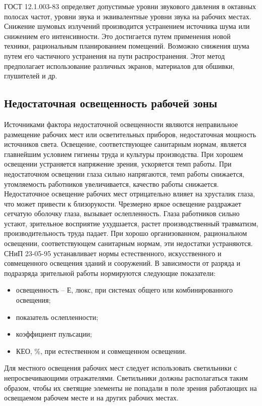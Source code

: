 ГОСТ 12.1.003-83 определяет допустимые уровни звукового давления в октавных полосах частот, уровни звука и эквивалентные уровни звука на рабочих местах. Снижение шумовых излучений производится устранением источника шума или снижением его интенсивности. Это достигается путем применения новой техники, рациональным планированием помещений. Возможно снижения шума путем его частичного устранения на пути распространения. Этот метод предполагает использование различных экранов, материалов для обшивки, глушителей и др.

\subsection{Недостаточная освещенность рабочей зоны}
Источниками фактора недостаточной освещенности являются неправильное размещение рабочих мест или осветительных приборов, недостаточная мощность источников света. Освещение, соответствующее санитарным нормам, является главнейшим условием гигиены труда и культуры производства. При хорошем освещении устраняется напряжение зрения, ускоряется темп работы. При недостаточном освещении глаза сильно напрягаются, темп работы снижается, утомляемость работников увеличивается, качество работы снижается. Недостаточное освещение рабочих мест отрицательно влияет на хрусталик глаза, что может привести к близорукости. Чрезмерно яркое освещение раздражает сетчатую оболочку глаза, вызывает ослепленность. Глаза работников сильно устают, зрительное восприятие ухудшается, растет производственный травматизм, производительность труда падает. При хорошо организованном, рациональном освещении, соответствующем санитарным нормам, эти недостатки устраняются.
СНиП 23-05-95 устанавливает нормы естественного, искусственного и совмещенного освещения зданий и сооружений. В зависимости от разряда и подразряда зрительной работы нормируются следующие показатели:
\begin{itemize}
	\item освещенность – Е, люкс, при системах общего или комбинированного освещения; 
	\item показатель ослепленности;
	\item коэффициент пульсации;
	\item КЕО, \%, при естественном и совмещенном освещении.
\end{itemize}
Для местного освещения рабочих мест следует использовать светильники с непросвечивающими отражателями. Светильники должны располагаться таким образом, чтобы их светящие элементы не попадали в поле зрения работающих на освещаемом рабочем месте и на других рабочих местах. 

